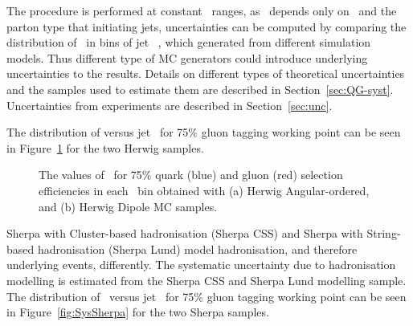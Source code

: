 The procedure is performed at constant \pt\ ranges, as \ntrk~depends only on \pt\ and the parton type that initiating jets, uncertainties can be computed by comparing the distribution of \ntrk~in bins of jet \pt~, which generated from different simulation models. Thus different type of MC generators could introduce underlying uncertainties to the results. Details on different types of theoretical uncertainties and the samples used to estimate them are described in Section~\ref{sec:QG-syst}.  Uncertainties from experiments are described in Section~\ref{sec:unc}.

The distribution of \ntrk versus jet \pt\ for 75\% gluon tagging working point can be seen in Figure~\ref{fig:SysHerwig} for the two Herwig samples. 

\begin{figure}[htb]
	\centering
	\caption{The values of \ntrk~for 75\% quark (blue) and gluon (red) selection efficiencies in each \pt\ bin obtained with
		(a) Herwig Angular-ordered, and
		(b) Herwig Dipole MC samples.
	}
	\label{fig:SysHerwig}
\end{figure}


Sherpa with Cluster-based hadronisation (Sherpa CSS) and Sherpa with String-based hadronisation (Sherpa Lund) model hadronisation, and therefore underlying events, 
differently. The systematic uncertainty due to hadronisation modelling is estimated from the Sherpa CSS and Sherpa Lund modelling sample.
The distribution of \ntrk~versus jet \pt\ for 75\% gluon tagging working point can be seen in Figure~\ref{fig:SysSherpa} for the two Sherpa samples.  

